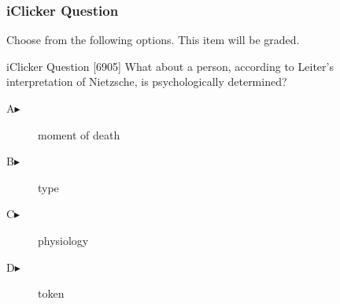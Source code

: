 \begin{frame}
  \frametitle{iClicker Question}
Choose from the following options. This item will be graded.
\begin{block}{iClicker Question}
[6905] What about a person, according to Leiter's interpretation of Nietzsche, is psychologically determined?
\end{block}
\begin{description}
\item[A\hspace{.2in}$\blacktriangleright$] moment of death
\item[B\hspace{.2in}$\blacktriangleright$] type
\item[C\hspace{.2in}$\blacktriangleright$] physiology
\item[D\hspace{.2in}$\blacktriangleright$] token
\end{description}
\end{frame}